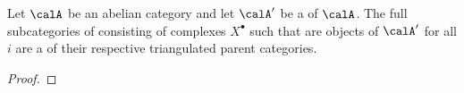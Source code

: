 \begin{proposition} \label{proposition:subcategory_of_homotopy_category_of_an_abelian_category_whose_cohomology_objects_belong_to_a_serre_subcategory_is_a_triangulated_subcategory}
    
    Let $\calA$ be an abelian category and let $\calA'$ be a  of $\calA$. The full subcategories of  consisting of complexes $X^\bullet$ such that  are objects of $\calA'$ for all $i$ are a  of their respective triangulated parent categories. 
\end{proposition}

\begin{proof}
\end{proof}